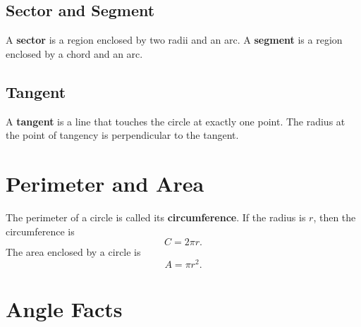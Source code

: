 \documentclass[12pt]{article}
\begin{document}
\subsection{Sector and Segment}
A \textbf{sector} is a region enclosed by two radii and an arc. A \textbf{segment} is a region enclosed by a chord and an arc.

\begin{center}
\end{center}

\subsection{Tangent}
A \textbf{tangent} is a line that touches the circle at exactly one point. The radius at the point of tangency is perpendicular to the tangent.

\begin{center}
\end{center}

\section{Perimeter and Area}
The perimeter of a circle is called its \textbf{circumference}. If the radius is $r$, then the circumference is
\begin{equation*}
C = 2\pi r.
\end{equation*}
The area enclosed by a circle is
\begin{equation*}
A = \pi r^2.
\end{equation*}

\section{Angle Facts}
\end{document}

